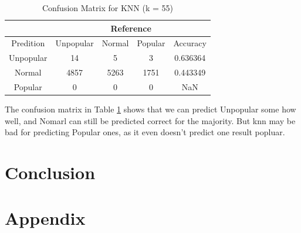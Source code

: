 \documentclass[11pt]{article}
\begin{document}
    \begin{table}[h]
        \centering
        \caption{Confusion Matrix for KNN (k = 55)}
        \begin{tabular}{ c | c | c | c | c }
            \hline\hline
            \multicolumn{1}{l}{} & \multicolumn{4}{c}{Reference} \\
            \hline
            Predition & Unpopular & Normal & Popular & Accuracy\\
            \hline
            Unpopular & 14 & 5 & 3 & 0.636364\\
            \hline
            Normal & 4857 & 5263 & 1751 & 0.443349\\
            \hline
            Popular & 0 & 0 & 0 & NaN\\
            \hline\hline
        \end{tabular}
        \label{table:knn}
    \end{table}

The confusion matrix in Table \ref{table:knn} shows that we can predict Unpopular some how well, and Nomarl can still be predicted correct for the majority. But knn may be bad for predicting Popular ones, as it even doesn't predict one result popluar.

\section{Conclusion}

\section{Appendix}
\end{document}
